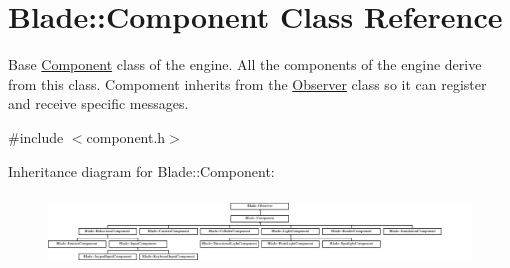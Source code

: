 \hypertarget{class_blade_1_1_component}{}\section{Blade\+:\+:Component Class Reference}
\label{class_blade_1_1_component}


Base \hyperlink{class_blade_1_1_component}{Component} class of the engine. All the components of the engine derive from this class. Compoment inherits from the \hyperlink{class_blade_1_1_observer}{Observer} class so it can register and receive specific messages.  




{\ttfamily \#include $<$component.\+h$>$}

Inheritance diagram for Blade\+:\+:Component\+:\begin{figure}[H]
\begin{center}
\leavevmode
\includegraphics[height=1.913875cm]{class_blade_1_1_component}
\end{center}
\end{figure}
